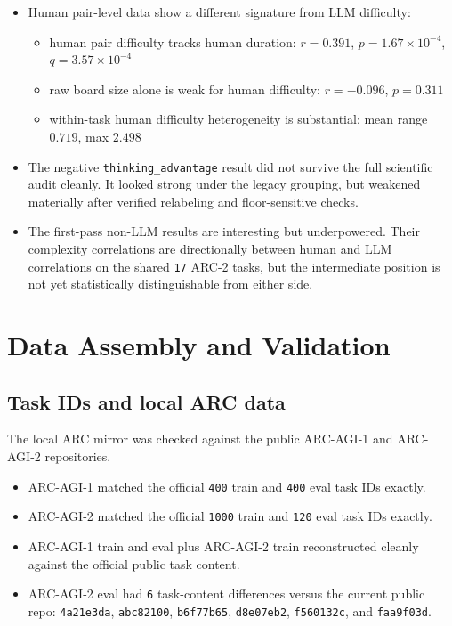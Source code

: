 \documentclass[11pt]{article}
\begin{document}
\begin{itemize}
\begin{itemize}
    \item residual human difficulty after removing LLM difficulty tracks human duration only suggestively: $r = 0.470$, $p = 0.0505$, $q = 0.0583$
  \end{itemize}
  \item Human pair-level data show a different signature from LLM difficulty:
  \begin{itemize}
    \item human pair difficulty tracks human duration: $r = 0.391$, $p = 1.67\times 10^{-4}$, $q = 3.57\times 10^{-4}$
    \item raw board size alone is weak for human difficulty: $r = -0.096$, $p = 0.311$
    \item within-task human difficulty heterogeneity is substantial: mean range $0.719$, max $2.498$
  \end{itemize}
  \item The negative \texttt{thinking\_advantage} result did not survive the full scientific audit cleanly. It looked strong under the legacy grouping, but weakened materially after verified relabeling and floor-sensitive checks.
  \item The first-pass non-LLM results are interesting but underpowered. Their complexity correlations are directionally between human and LLM correlations on the shared \texttt{17} ARC-2 tasks, but the intermediate position is not yet statistically distinguishable from either side.
\end{itemize}

\section*{Data Assembly and Validation}

\subsection*{Task IDs and local ARC data}

The local ARC mirror was checked against the public ARC-AGI-1 and ARC-AGI-2 repositories.

\begin{itemize}
  \item ARC-AGI-1 matched the official \texttt{400} train and \texttt{400} eval task IDs exactly.
  \item ARC-AGI-2 matched the official \texttt{1000} train and \texttt{120} eval task IDs exactly.
  \item ARC-AGI-1 train and eval plus ARC-AGI-2 train reconstructed cleanly against the official public task content.
  \item ARC-AGI-2 eval had \texttt{6} task-content differences versus the current public repo: \texttt{4a21e3da}, \texttt{abc82100}, \texttt{b6f77b65}, \texttt{d8e07eb2}, \texttt{f560132c}, and \texttt{faa9f03d}.
\end{itemize}
\end{document}
